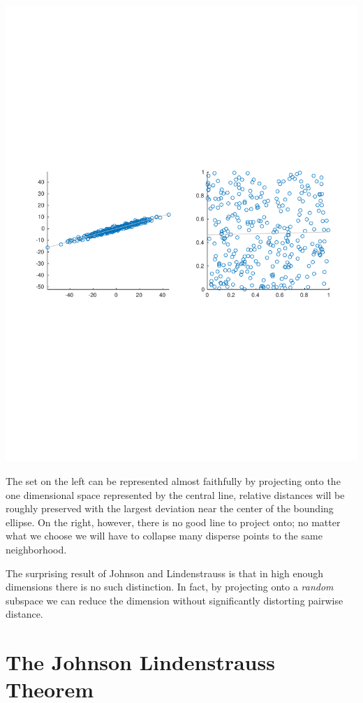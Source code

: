 \documentclass[11pt]{article}
\begin{document}
\begin{center}
    \includegraphics[trim=0 280 0 280, clip,width=\textwidth]{2dplots.pdf}
\end{center}

The set on the left can be represented almost faithfully by projecting onto the one dimensional space represented by the central line, relative distances will be roughly preserved with the largest deviation near the center of the bounding ellipse. On the right, however, there is no good line to project onto; no matter what we choose we will have to collapse many disperse points to the same neighborhood. 

The surprising result of Johnson and Lindenstrauss \cite{oldpaper} is that in high enough dimensions there is no such distinction. In fact, by projecting onto a \textit{random} subspace we can reduce the dimension without significantly distorting pairwise distance.

\section{The Johnson Lindenstrauss Theorem}
\end{document}
